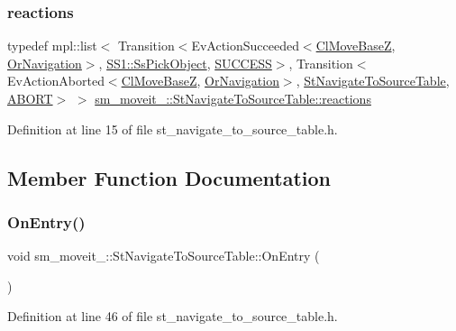 \subsubsection{\texorpdfstring{reactions}{reactions}}
{\footnotesize\ttfamily typedef mpl\+::list$<$ Transition$<$Ev\+Action\+Succeeded$<$\hyperlink{classcl__move__base__z_1_1ClMoveBaseZ}{Cl\+Move\+BaseZ}, \hyperlink{classsm__moveit__4_1_1OrNavigation}{Or\+Navigation}$>$, \hyperlink{structsm__moveit__4_1_1SS1_1_1SsPickObject}{S\+S1\+::\+Ss\+Pick\+Object}, \hyperlink{classSUCCESS}{S\+U\+C\+C\+E\+SS}$>$, Transition$<$Ev\+Action\+Aborted$<$\hyperlink{classcl__move__base__z_1_1ClMoveBaseZ}{Cl\+Move\+BaseZ}, \hyperlink{classsm__moveit__4_1_1OrNavigation}{Or\+Navigation}$>$, \hyperlink{structsm__moveit__4_1_1StNavigateToSourceTable}{St\+Navigate\+To\+Source\+Table}, \hyperlink{classABORT}{A\+B\+O\+RT}$>$ $>$ \hyperlink{structsm__moveit__4_1_1StNavigateToSourceTable_a83fbcaf1bf1abdbcac936c6c3201893d}{sm\+\_\+moveit\+\_\+::\+St\+Navigate\+To\+Source\+Table\+::reactions}}



Definition at line 15 of file st\+\_\+navigate\+\_\+to\+\_\+source\+\_\+table.\+h.



\subsection{Member Function Documentation}
\mbox{\label{structsm__moveit__4_1_1StNavigateToSourceTable_aa90111c5a22ed67dfe20024a7b135837}} 
\subsubsection{\texorpdfstring{On\+Entry()}{OnEntry()}}
{\footnotesize\ttfamily void sm\+\_\+moveit\+\_\+::\+St\+Navigate\+To\+Source\+Table\+::\+On\+Entry (\begin{DoxyParamCaption}{ }\end{DoxyParamCaption})\hspace{0.3cm}{\ttfamily [inline]}}



Definition at line 46 of file st\+\_\+navigate\+\_\+to\+\_\+source\+\_\+table.\+h.


